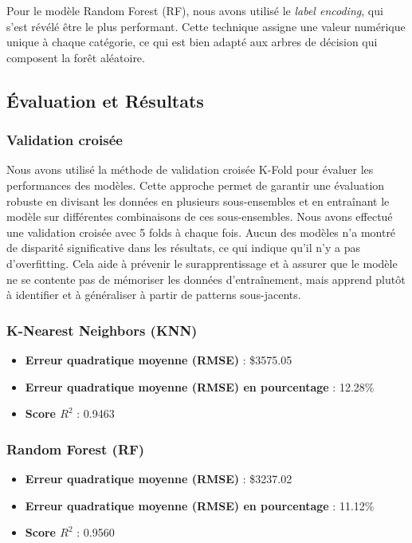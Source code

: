 \documentclass[12pt]{report}
\begin{document}
Pour le modèle Random Forest (RF), nous avons utilisé le \textit{label encoding}, qui s'est révélé être le plus performant. Cette technique assigne une valeur numérique unique à chaque catégorie, ce qui est bien adapté aux arbres de décision qui composent la forêt aléatoire.

\subsection{Évaluation et Résultats}

\subsubsection{Validation croisée}

Nous avons utilisé la méthode de validation croisée K-Fold pour évaluer les performances des modèles. Cette approche permet de garantir une évaluation robuste en divisant les données en plusieurs sous-ensembles et en entraînant le modèle sur différentes combinaisons de ces sous-ensembles. Nous avons effectué une validation croisée avec 5 folds à chaque fois. Aucun des modèles n'a montré de disparité significative dans les résultats, ce qui indique qu'il n'y a pas d'overfitting. Cela aide à prévenir le surapprentissage et à assurer que le modèle ne
se contente pas de mémoriser les données d'entraînement, mais apprend plutôt à identifier
et à généraliser à partir de patterns sous-jacents.


\subsubsection{K-Nearest Neighbors (KNN)}

\begin{itemize}
    \item \textbf{Erreur quadratique moyenne (RMSE)} : \$3575.05
    \item \textbf{Erreur quadratique moyenne (RMSE) en pourcentage} : 12.28\%
    \item \textbf{Score \( R^2 \)} : 0.9463
\end{itemize}

\subsubsection{Random Forest (RF)}

\begin{itemize}
    \item \textbf{Erreur quadratique moyenne (RMSE)} : \$3237.02
    \item \textbf{Erreur quadratique moyenne (RMSE) en pourcentage} : 11.12\%
    \item \textbf{Score \( R^2 \)} : 0.9560
\end{itemize}
\end{document}
